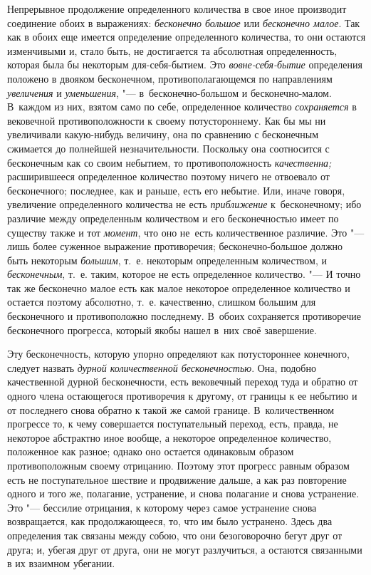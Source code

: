 Непрерывное продолжение определенного количества в свое иное производит
соединение обоих в выражениях: {\em бесконечно большое} или {\em бесконечно
малое}. Так как в обоих еще имеется определение определенного количества, то
они остаются изменчивыми и, стало быть, не достигается та абсолютная
определенность, которая была бы некоторым для-себя-бытием. Это
{\em вовне-себя-бытие} определения положено в двояком бесконечном,
противополагающемся по направлениям {\em увеличения} и {\em уменьшения}, "---
в~бесконечно-большом и бесконечно-малом. В~каждом из них, взятом само по себе,
определенное количество {\em сохраняется} в вековечной противоположности к
своему потустороннему. Как бы мы ни увеличивали какую-нибудь величину, она по
сравнению с бесконечным сжимается до полнейшей незначительности. Поскольку она
соотносится с бесконечным как со своим небытием, то противоположность
{\em качественна;} расширившееся определенное количество поэтому ничего не
отвоевало от бесконечного; последнее, как и раньше, есть его небытие. Или,
иначе говоря, увеличение определенного количества не есть {\em приближение}
к~бесконечному; ибо различие между определенным количеством и его
бесконечностью имеет по существу также и тот {\em момент}, что оно не~есть
количественное различие. Это "--- лишь более суженное выражение противоречия;
бесконечно-большое должно быть некоторым {\em большим}, т.~е. некоторым
определенным количеством, и {\em бесконечным}, т.~е. таким, которое не есть
определенное количество. "--- И точно так же бесконечно малое есть как малое
некоторое определенное количество и остается поэтому абсолютно, т.~е.
качественно, слишком большим для бесконечного и противоположно последнему.
В~обоих сохраняется противоречие бесконечного прогресса, который якобы нашел
в~них своё завершение.

Эту бесконечность, которую упорно определяют как потустороннее конечного,
следует назвать {\em дурной количественной бесконечностью}. Она, подобно
качественной дурной бесконечности, есть вековечный переход туда и обратно от
одного члена остающегося противоречия к другому, от границы к ее небытию и от
последнего снова обратно к такой же самой границе. В~количественном прогрессе
то, к чему совершается поступательный переход, есть, правда, не некоторое
абстрактно иное вообще, а некоторое определенное количество, положенное как
разное; однако оно остается одинаковым образом противоположным своему
отрицанию. Поэтому этот прогресс равным образом есть не поступательное шествие
и продвижение дальше, а как раз повторение одного и того же, полагание,
устранение, и снова полагание и снова устранение. Это "--- бессилие отрицания,
к которому через самое устранение снова возвращается, как продолжающееся, то,
что им было устранено. Здесь два определения так связаны между собою, что они
безоговорочно бегут друг от друга; и, убегая друг от друга, они не могут
разлучиться, а остаются связанными в их взаимном убегании.

